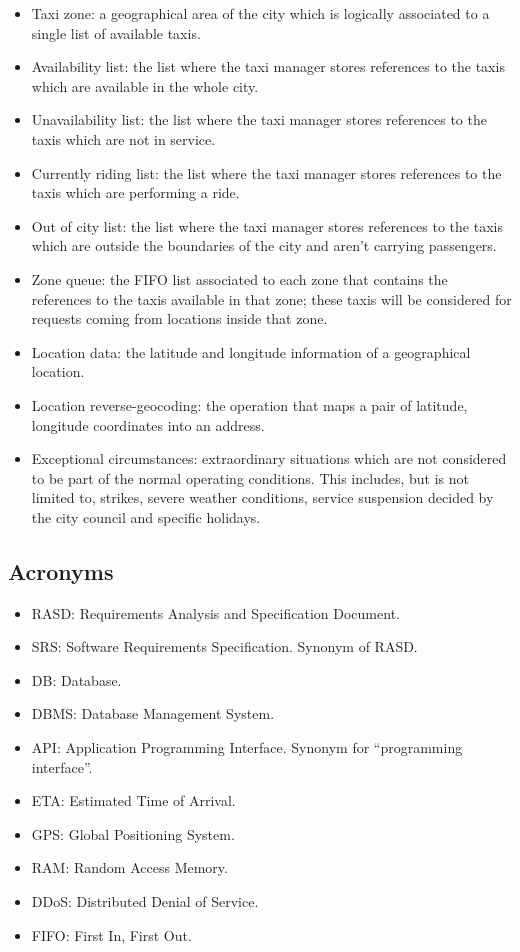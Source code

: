 \begin{itemize}
\item Taxi zone: a geographical area of the city which is logically associated to a single list of available taxis. 
\item Availability list: the list where the taxi manager stores references to the taxis which are available in the whole city.
\item Unavailability list: the list where the taxi manager stores references to the taxis which are not in service.
\item Currently riding list: the list where the taxi manager stores references to the taxis which are performing a ride.
\item Out of city list: the list where the taxi manager stores references to the taxis which are outside the boundaries of the city and aren't carrying passengers. 
\item Zone queue: the FIFO list associated to each zone that contains the references to the taxis available in that zone; these taxis will be considered for requests coming from locations inside that zone. 
\item Location data: the latitude and longitude information of a geographical location.
\item Location reverse-geocoding: the operation that maps a pair of latitude, longitude coordinates into an address. 
\item Exceptional circumstances: extraordinary situations which are not considered to be part of the normal operating conditions. This includes, but is not limited to, strikes, severe weather conditions, service suspension decided by the city council and specific holidays.
\end{itemize}


\subsection{Acronyms}
\begin{itemize}
\item RASD: Requirements Analysis and Specification Document.
\item SRS: Software Requirements Specification. Synonym of RASD.
\item DB: Database.
\item DBMS: Database Management System.
\item API: Application Programming Interface. Synonym for ``programming interface''.
\item ETA: Estimated Time of Arrival.
\item GPS: Global Positioning System.
\item RAM: Random Access Memory.
\item DDoS: Distributed Denial of Service.
\item FIFO: First In, First Out.
\end{itemize}


